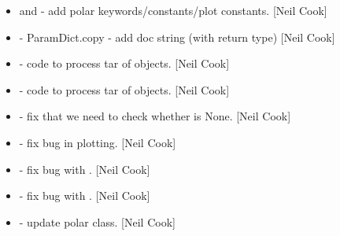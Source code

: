 \documentclass[a4paper,10pt,english]{report}
\begin{document}
\begin{itemize}
\item {} 
 and  - add polar
keywords/constants/plot constants. {[}Neil Cook{]}

\item {} 
 - ParamDict.copy - add doc string
(with return type) {[}Neil Cook{]}

\item {} 
 - code to process tar of objects. {[}Neil Cook{]}

\item {} 
 - code to process tar of objects. {[}Neil Cook{]}

\item {} 
 - fix that we need to check whether
 is None. {[}Neil Cook{]}

\item {} 
 - fix bug in plotting. {[}Neil Cook{]}

\item {} 
 - fix bug with . {[}Neil
Cook{]}

\item {} 
 - fix bug with . {[}Neil
Cook{]}

\item {} 
 - update polar class. {[}Neil Cook{]}

\end{itemize}
\end{document}
